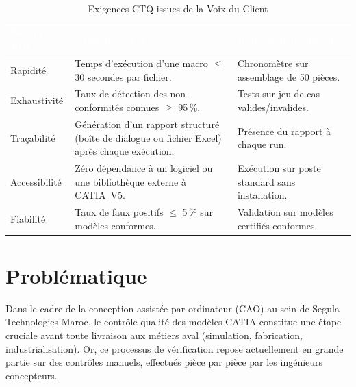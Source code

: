 \begin{table}[H]
    \centering
    \caption{Exigences CTQ issues de la Voix du Client}%
    \label{tab:ctq}
    \begin{tabularx}{\textwidth}{|>{\raggedright\arraybackslash}p{3.2cm}|X|>{\raggedright\arraybackslash}p{3.5cm}|}
        \hline
        \rowcolor{headerblue}
        \textcolor{white}{\textbf{Besoin VOC}} & \centering\textcolor{white}{\textbf{Exigence CTQ}} & \textcolor{white}{\textbf{Indicateur de mesure}}\tabularnewline
        \hline
        \rowcolor{rowlight}
        Rapidité & Temps d'exécution d'une macro $\leq$ 30 secondes par fichier. & Chronomètre sur assemblage de 50 pièces. \\
        \hline
        \rowcolor{rowwhite}
        Exhaustivité & Taux de détection des non-conformités connues $\geq$ 95\,\%. & Tests sur jeu de cas valides/invalides. \\
        \hline
        \rowcolor{rowlight}
        Traçabilité & Génération d'un rapport structuré (boîte de dialogue ou fichier Excel) après chaque exécution. & Présence du rapport à chaque run. \\
        \hline
        \rowcolor{rowwhite}
        Accessibilité & Zéro dépendance à un logiciel ou une bibliothèque externe à CATIA~V5. & Exécution sur poste standard sans installation. \\
        \hline
        \rowcolor{rowlight}
        Fiabilité & Taux de faux positifs $\leq$ 5\,\% sur modèles conformes. & Validation sur modèles certifiés conformes. \\
        \hline
    \end{tabularx}
\end{table}

\section{Problématique}

Dans le cadre de la conception assistée par ordinateur (CAO) au sein de Segula Technologies Maroc, le contrôle qualité des modèles CATIA constitue une étape cruciale avant toute livraison aux métiers aval (simulation, fabrication, industrialisation). Or, ce processus de vérification repose actuellement en grande partie sur des contrôles manuels, effectués pièce par pièce par les ingénieurs concepteurs.


